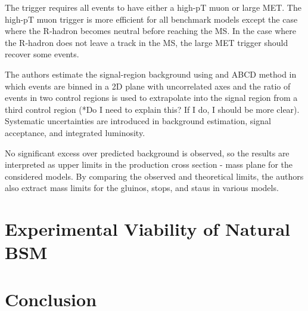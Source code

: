 \documentclass[12pt]{article}
\begin{document}
    The trigger requires all events to have either a high-pT muon or large MET. The high-pT muon trigger is more efficient for all benchmark models except the case where the R-hadron becomes neutral before reaching the MS. In the case where the R-hadron does not leave a track in the MS, the large MET trigger should recover some events.  

    The authors estimate the signal-region background using and ABCD method in which events are binned in a 2D plane with uncorrelated axes and the ratio of events in two control regions is used to extrapolate into the signal region from a third control region (*Do I need to explain this? If I do, I should be more clear). Systematic uncertainties are introduced in background estimation, signal acceptance, and integrated luminosity.

    No significant excess over predicted background is observed, so the results are interpreted as upper limits in the production cross section - mass plane for the considered models. By comparing the observed and theoretical limits, the authors also extract mass limits for the gluinos, stops, and staus in various models.

\section{Experimental Viability of Natural BSM}

\section{Conclusion}

\clearpage
\pagebreak
\singlespacing
{}

\end{document}
